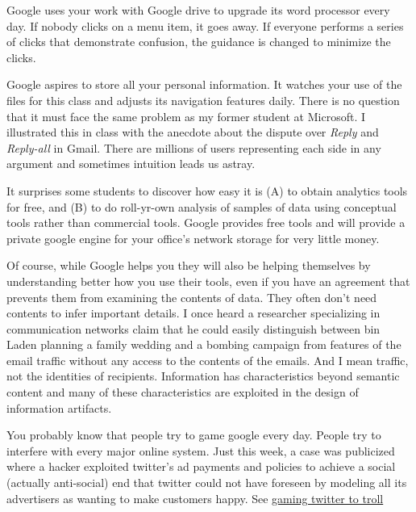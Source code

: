 \hypertarget{google-analytics}{%
\label{google-analytics}}

Google uses your work with Google drive to upgrade its word processor
every day. If nobody clicks on a menu item, it goes away. If everyone
performs a series of clicks that demonstrate confusion, the guidance is
changed to minimize the clicks.

Google aspires to store all your personal information. It watches your
use of the files for this class and adjusts its navigation features
daily. There is no question that it must face the same problem as my
former student at Microsoft. I illustrated this in class with the
anecdote about the dispute over \emph{Reply} and \emph{Reply-all} in
Gmail. There are millions of users representing each side in any
argument and sometimes intuition leads us astray.

It surprises some students to discover how easy it is (A) to obtain
analytics tools for free, and (B) to do roll-yr-own analysis of samples
of data using conceptual tools rather than commercial tools. Google
provides free tools and will provide a private google engine for your
office's network storage for very little money.

Of course, while Google helps you they will also be helping themselves
by understanding better how you use their tools, even if you have an
agreement that prevents them from examining the contents of data. They
often don't need contents to infer important details. I once heard a
researcher specializing in communication networks claim that he could
easily distinguish between bin Laden planning a family wedding and a
bombing campaign from features of the email traffic without any access
to the contents of the emails. And I mean traffic, not the identities of
recipients. Information has characteristics beyond semantic content and
many of these characteristics are exploited in the design of information
artifacts.

\hypertarget{gaming-the-system}{%
\label{gaming-the-system}}

You probably know that people try to game google every day. People try
to interfere with every major online system. Just this week, a case was
publicized where a hacker exploited twitter's ad payments and policies
to achieve a social (actually anti-social) end that twitter could not
have foreseen by modeling all its advertisers as wanting to make
customers happy. See
\href{http://arstechnica.com/business/2015/05/how-someone-spent-pennies-to-troll-women-people-of-color-via-promoted-tweets/}{gaming
twitter to troll}

